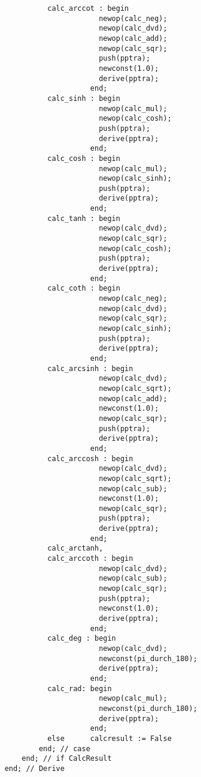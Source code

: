 \begin{refsection}
\begin{lstlisting}
              calc_arccot : begin
                          newop(calc_neg);
                          newop(calc_dvd);
                          newop(calc_add);
                          newop(calc_sqr);
                          push(pptra);
                          newconst(1.0);
                          derive(pptra);
                        end;
              calc_sinh : begin
                          newop(calc_mul);
                          newop(calc_cosh);
                          push(pptra);
                          derive(pptra);
                        end;
              calc_cosh : begin
                          newop(calc_mul);
                          newop(calc_sinh);
                          push(pptra);
                          derive(pptra);
                        end;
              calc_tanh : begin
                          newop(calc_dvd);
                          newop(calc_sqr);
                          newop(calc_cosh);
                          push(pptra);
                          derive(pptra);
                        end;
              calc_coth : begin
                          newop(calc_neg);
                          newop(calc_dvd);
                          newop(calc_sqr);
                          newop(calc_sinh);
                          push(pptra);
                          derive(pptra);
                        end;
              calc_arcsinh : begin
                          newop(calc_dvd);
                          newop(calc_sqrt);
                          newop(calc_add);
                          newconst(1.0);
                          newop(calc_sqr);
                          push(pptra);
                          derive(pptra);
                        end;
              calc_arccosh : begin
                          newop(calc_dvd);
                          newop(calc_sqrt);
                          newop(calc_sub);
                          newconst(1.0);
                          newop(calc_sqr);
                          push(pptra);
                          derive(pptra);
                        end;
              calc_arctanh,
              calc_arccoth : begin
                          newop(calc_dvd);
                          newop(calc_sub);
                          newop(calc_sqr);
                          push(pptra);
                          newconst(1.0);
                          derive(pptra);
                        end;
              calc_deg : begin
                          newop(calc_dvd);
                          newconst(pi_durch_180);
                          derive(pptra);
                        end;
              calc_rad: begin
                          newop(calc_mul);
                          newconst(pi_durch_180);
                          derive(pptra);
                        end;
              else      calcresult := False
            end; // case
        end; // if CalcResult
    end; // Derive


\end{lstlisting}
\end{refsection}
